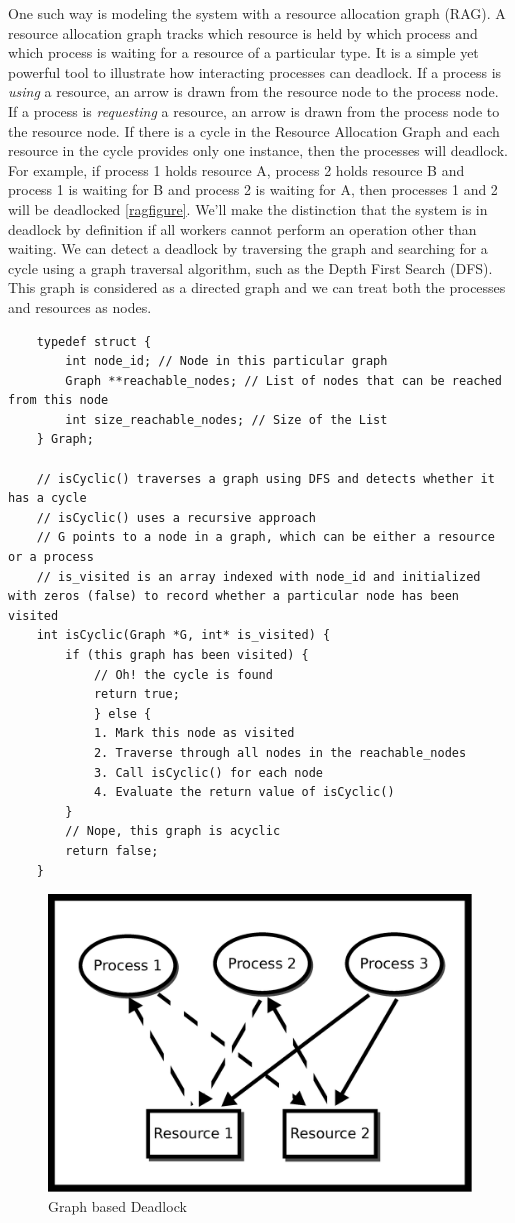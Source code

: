 One such way is modeling the system with a resource allocation graph (RAG).
A resource allocation graph tracks which resource is held by which process and which process is waiting for a resource of a particular type.
It is a simple yet powerful tool to illustrate how interacting processes can deadlock.
If a process is \emph{using} a resource, an arrow is drawn from the resource node to the process node.
If a process is \emph{requesting} a resource, an arrow is drawn from the process node to the resource node.
If there is a cycle in the Resource Allocation Graph and each resource in the cycle provides only one instance, then the processes will deadlock.
For example, if process 1 holds resource A, process 2 holds resource B and process 1 is waiting for B and process 2 is waiting for A, then processes 1 and 2 will be deadlocked \ref{ragfigure}.
We'll make the distinction that the system is in deadlock by definition if all workers cannot perform an operation other than waiting.
We can detect a deadlock by traversing the graph and searching for a cycle using a graph traversal algorithm, such as the Depth First Search (DFS).
This graph is considered as a directed graph and we can treat both the processes and resources as nodes.

\begin{verbatim}
	typedef struct {
		int node_id; // Node in this particular graph
		Graph **reachable_nodes; // List of nodes that can be reached from this node
		int size_reachable_nodes; // Size of the List
	} Graph;
	
	// isCyclic() traverses a graph using DFS and detects whether it has a cycle
	// isCyclic() uses a recursive approach
	// G points to a node in a graph, which can be either a resource or a process
	// is_visited is an array indexed with node_id and initialized with zeros (false) to record whether a particular node has been visited
	int isCyclic(Graph *G, int* is_visited) {
		if (this graph has been visited) {
			// Oh! the cycle is found
			return true;
			} else {
			1. Mark this node as visited
			2. Traverse through all nodes in the reachable_nodes
			3. Call isCyclic() for each node
			4. Evaluate the return value of isCyclic()
		}
		// Nope, this graph is acyclic
		return false;
	}
\end{verbatim}

\begin{figure}[H]
	\centering
	\includegraphics[width=.5\textwidth]{deadlock/drawings/deadlock.eps}
	\caption{Graph based Deadlock}
\end{figure}

